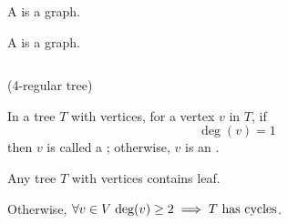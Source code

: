 
\begin{frame}{}
  \begin{definition}[Tree (树)]
    A  is a    graph.
  \end{definition}

  \pause
  \vspace{0.80cm}
  \begin{definition}[Forest (森林)]
    A  is a   graph.
  \end{definition}
\end{frame}

\begin{frame}{}
  \begin{columns}
  \end{columns}

  \pause
  \vspace{0.80cm}
\end{frame}

\begin{frame}{}
  \begin{center}
     (4-regular tree)
  \end{center}
\end{frame}

\begin{frame}{}
  \begin{definition}
    In a tree $T$ with  vertices, for a vertex $v$ in $T$, if
    \[
      \deg(v) = 1
    \]
    then $v$ is called a ;
    otherwise, $v$ is an .
  \end{definition}

  \pause
  \vspace{0.30cm}

  \pause
  \begin{lemma}
    Any tree $T$ with  vertices contains  leaf.
  \end{lemma}

  \pause
  \begin{center}
    Otherwise, $\forall v \in V\; \text{deg}(v) \ge 2 \implies T \text{ has cycles}$.
  \end{center}
\end{frame}

